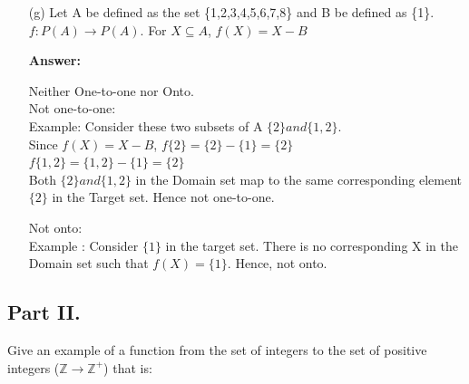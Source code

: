 \documentclass[14pt]{extreport}
\newcommand{\answer}[0]{\medskip \textbf{Answer:} \medskip}
\begin{document}
\begin{enumerate}
    \item[(g)] Let A be defined as the set \{1,2,3,4,5,6,7,8\} and B be defined as \{1\}. \\
    \(f: P\left(A\right) \to P\left(A\right)\). For \(X \subseteq A\), \(f\left(X\right) = X-B\)
    
        \answer
        
        Neither One-to-one nor Onto. \\
        
        Not one-to-one: \\
        Example: Consider these two subsets of A \(\{2\} and \{1,2\}\). \\Since \(f\left(X\right) = X-B\), 
        \newline
        \(f\{2\} = \{2\}-\{1\} = \{2\}\) \\
        \(f\{1,2\} = \{1,2\}-\{1\} = \{2\}\) \\
        Both \(\{2\} and \{1,2\}\) in the Domain set map to the same corresponding element \(\{2\}\) in the Target set. Hence not one-to-one. 
        \newline
        
        Not onto: \\
        Example : Consider \(\{1\}\) in the target set. There is no corresponding X in the Domain set such that \(f\left(X\right) = \{1\}\). Hence, not onto. 
        
\end{enumerate}

\subsection*{Part II.}

Give an example of a function from the set of integers to the set of positive integers ($\mathbb{Z} \rightarrow \mathbb{Z^{+}}$) that is: 
\end{document}
